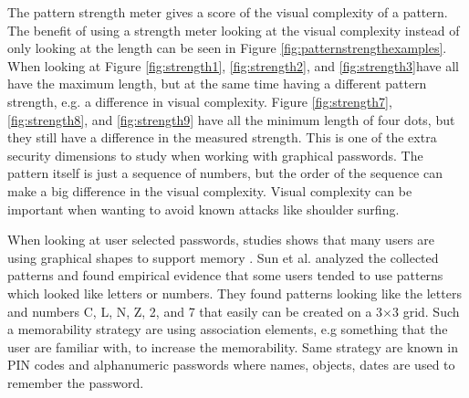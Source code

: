  The pattern strength meter gives a score of the visual complexity of a pattern. The benefit of using a strength meter looking at the visual complexity instead of only looking at the length can be seen in Figure \ref{fig:patternstrengthexamples}. When looking at Figure \ref{fig:strength1}, \ref{fig:strength2}, and \ref{fig:strength3}have all have the maximum length, but at the same time having a different pattern strength, e.g. a difference in visual complexity. Figure \ref{fig:strength7}, \ref{fig:strength8}, and \ref{fig:strength9} have all the minimum length of four dots, but they still have a difference in the measured strength. This is one of the extra security dimensions to study when working with graphical passwords. The pattern itself is just a sequence of numbers, but the order of the sequence can make a big difference in the visual complexity. Visual complexity can be important when wanting to avoid known attacks like shoulder surfing. 

  When looking at user selected passwords, studies shows that many users are using graphical shapes to support memory \cite{Weiss}. Sun et al. \cite{Sun} analyzed the collected patterns and found empirical evidence that some users tended to use patterns which looked like letters or numbers. They found patterns looking like the letters and numbers C, L, N, Z, 2, and 7 that easily can be created on a 3$\times$3 grid. Such a memorability strategy are using association elements, e.g something that the user are familiar with, to increase the memorability. Same strategy are known in PIN codes and alphanumeric passwords where names, objects, dates are used to remember the password.

